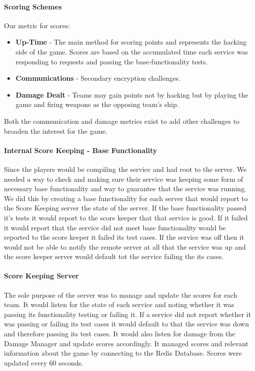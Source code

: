 \documentclass[10pt]{article}
\begin{document}
\paragraph*{Scoring Schemes} Our metric for scores:
\begin{itemize}
  \item \textbf{Up-Time} - The main method for scoring points and
  represents the hacking side of the game. Scores are based on the accumulated
  time each service was responding to requests and passing the base-functionality tests. 
  \item \textbf{Communications} - Secondary encryption challenges.
  \item \textbf{Damage Dealt} - Teams may gain points not by hacking but by
  playing the game and firing weapons as the opposing team's ship.
\end{itemize}

Both the communication and damage metrics exist to add other challenges to
broaden the interest for the game.

\paragraph*{Internal Score Keeping - Base Functionality}
Since the players would be compiling the service and had root to the server. We needed
a way to check and making sure their service was keeping some form of necessary base 
functionality and way to guarantee that the service was running. We did this
by creating a base functionality for each server that would report to the Score Keeping
server the state of the server. If the base functionality passed it's tests it  would report 
to the score keeper that that service is good. If it failed it would report that the service 
did not meet base functionality would be reported to the score keeper it failed its test
cases. If the service was off then it would not be able to notify the remote server at all
that the service was up and the score keeper server would default tot the service
failing the its cases.

\paragraph*{Score Keeping Server}
The sole purpose of the server was to manage and update the scores for each team. It would
listen for the state of each service and noting whether it was passing its functionality 
testing or failing it. If a service did not report whether it was passing or failing its
test cases it would default to that the service was down and therefore passing its test
cases. It would also listen for damage from the Damage Manager and update scores
accordingly. It managed scores and relevant information about the game by connecting to
the Redis Database. Scores were updated every 60 seconds.
\end{document}

